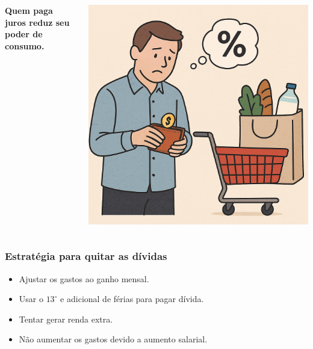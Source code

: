 \begin{frame}[c]
    \frametitle{}
    \begin{columns}
        \begin{column}{0.5\textwidth}
            \centering
            \textbf{\Large Quem paga juros reduz seu poder de consumo.}
        \end{column}
        \begin{column}{0.5\textwidth}
            \includegraphics[width=\textwidth]{../figuras/consumo2.png}
        \end{column}
    \end{columns}
\end{frame}



\begin{frame}[c]\frametitle{Estratégia para quitar as dívidas}
    \begin{itemize}
        \item Ajustar os gastos ao ganho mensal.
        \item Usar o $13^\circ$ e adicional de férias para pagar dívida.
        \item Tentar gerar renda extra.
        \item Não aumentar os gastos devido a aumento salarial.
    \end{itemize}
\end{frame}


